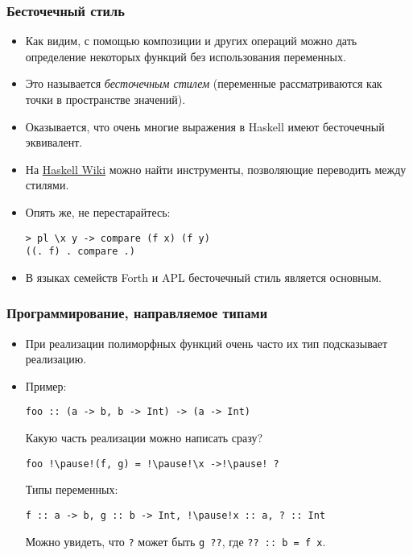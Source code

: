 \documentclass[10pt]{beamer}
\begin{document}
\begin{frame}[fragile]
  \frametitle{Бесточечный стиль}
  \begin{itemize}
    \item Как видим, с помощью композиции и других операций можно дать определение некоторых функций без использования переменных.
    \item Это называется \emph{бесточечным стилем} (переменные рассматриваются как точки в пространстве значений).\pause
    \item Оказывается, что очень многие выражения в Haskell имеют бесточечный эквивалент.
    \item На \href{https://wiki.haskell.org/Pointfree}{Haskell Wiki} можно найти инструменты, позволяющие переводить между стилями.
    \item Опять же, не перестарайтесь:
          \begin{lstlisting}
> pl \x y -> compare (f x) (f y)
((. f) . compare .)
\end{lstlisting}\pause
    \item В языках семейств Forth и APL бесточечный стиль является основным.
  \end{itemize}
\end{frame}

\begin{frame}[fragile]
  \frametitle{Программирование, направляемое типами}
  \begin{itemize}
    \item При реализации полиморфных функций очень часто их тип подсказывает реализацию.
    \item Пример:
          \begin{lstlisting}
foo :: (a -> b, b -> Int) -> (a -> Int)
\end{lstlisting}
          Какую часть реализации можно написать сразу?
          \begin{lstlisting}
foo !\pause!(f, g) = !\pause!\x ->!\pause! ?
\end{lstlisting}
          Типы переменных:\pause
          \begin{lstlisting}
f :: a -> b, g :: b -> Int, !\pause!x :: a, ? :: Int
\end{lstlisting}
          Можно увидеть, что \lstinline|?| может быть \lstinline|g ??|, где \lstinline|?? :: |\pause\lstinline|b = |\pause\lstinline|f x|.
  \end{itemize}
\end{frame}
\end{document}
